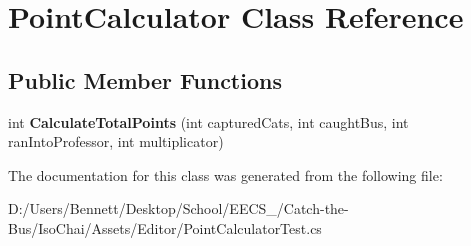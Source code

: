 \hypertarget{class_point_calculator}{}\section{Point\+Calculator Class Reference}
\label{class_point_calculator}
\subsection*{Public Member Functions}
\begin{DoxyCompactItemize}
\item 
\mbox{\label{class_point_calculator_af1ccfbb22dfbc25ff895ec705d1e369c}} 
int {\bfseries Calculate\+Total\+Points} (int captured\+Cats, int caught\+Bus, int ran\+Into\+Professor, int multiplicator)
\end{DoxyCompactItemize}


The documentation for this class was generated from the following file\+:\begin{DoxyCompactItemize}
\item 
D\+:/\+Users/\+Bennett/\+Desktop/\+School/\+E\+E\+C\+S\+\_/\+Catch-\/the-\/\+Bus/\+Iso\+Chai/\+Assets/\+Editor/Point\+Calculator\+Test.\+cs\end{DoxyCompactItemize}
